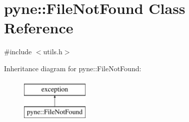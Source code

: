 \hypertarget{classpyne_1_1_file_not_found}{}\section{pyne\+:\+:File\+Not\+Found Class Reference}
\label{classpyne_1_1_file_not_found}


{\ttfamily \#include $<$utils.\+h$>$}

Inheritance diagram for pyne\+:\+:File\+Not\+Found\+:\begin{figure}[H]
\begin{center}
\leavevmode
\includegraphics[height=2.000000cm]{classpyne_1_1_file_not_found}
\end{center}
\end{figure}
